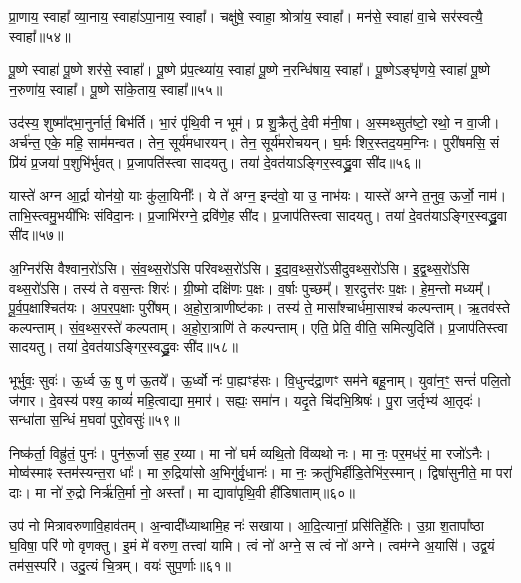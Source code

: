 प्रा॒णाय॒ स्वाहा᳚ व्या॒नाय॒ स्वाहा॑ऽपा॒नाय॒ स्वाहा᳚। 
चक्षु॑षे॒ स्वाहा॒ श्रोत्रा॑य॒ स्वाहा᳚। 
मन॑से॒ स्वाहा॑ वा॒चे सर॑स्वत्यै॒ स्वाहा᳚॥५४॥%
\anuvakamend

पू॒ष्णे स्वाहा॑ पू॒ष्णे शर॑से॒ स्वाहा᳚। 
पू॒ष्णे प्र॑प॒त्थ्या॑य॒ स्वाहा॑ पू॒ष्णे न॒रन्धि॑षाय॒ स्वाहा᳚। 
पू॒ष्णेऽङ्घृ॑णये॒ स्वाहा॑ पू॒ष्णे न॒रुणा॑य॒ स्वाहा᳚। 
पू॒ष्णे सा॑के॒ताय॒ स्वाहा᳚॥५५॥
\anuvakamend


उद॑स्य॒ शुष्मा᳚द्भा॒नुर्नार्त॒ बिभ॑र्ति। 
भा॒रं पृ॑थि॒वी न भूम॑। 
प्र शु॒क्रैतु॑ दे॒वी म॑नी॒षा। 
अ॒स्मथ्सुत॑ष्टो॒ रथो॒ न वा॒जी। 
अर्च॑न्त॒ एके॒ महि॒ साम॑मन्वत। 
तेन॒ सूर्य॑मधारयन्। 
तेन॒ सूर्य॑मरोचयन्। 
घ॒र्मः  शिर॒स्तद॒यम॒ग्निः। 
पुरी॑षमसि॒ सं प्रि॑यं प्र॒जया॑ प॒शुभि॑र्भुवत्। 
प्र॒जापति॑स्त्वा सादयतु। 
तया॑ दे॒वत॑याऽङ्गिर॒स्वद्ध्रु॒वा सी॑द॥५६॥
\anuvakamend

यास्ते॑ अग्न आ॒र्द्रा योन॑यो॒ याः कु॑ला॒यिनीः᳚। 
ये ते॑ अग्न॒ इन्द॑वो॒ या उ॒ नाभ॑यः। 
यास्ते॑ अग्ने त॒नुव॒ ऊर्जो॒ नाम॑। 
ताभि॒स्त्वमु॒भयी॑भिः संविदा॒नः। 
प्र॒जाभि॑रग्ने॒ द्रवि॑णे॒ह सी॑द। 
प्र॒जाप॑तिस्त्वा सादयतु। 
तया॑ दे॒वत॑याऽङ्गिर॒स्वद्ध्रु॒वा सी॑द॥५७॥
\anuvakamend

अ॒ग्निर॑सि वैश्वान॒रो॑ऽसि। 
सं॒व॒थ्स॒रो॑ऽसि परिवथ्स॒रो॑ऽसि। 
इ॒दा॒व॒थ्स॒रो॑ऽसीदुवथ्स॒रो॑ऽसि। 
इ॒द्व॒थ्स॒रो॑ऽसि वथ्स॒रो॑ऽसि। 
तस्य॑ ते वस॒न्तः  शिरः॑। 
ग्री॒ष्मो दक्षि॑णः प॒क्षः। 
व॒र्\mbox{}षाः पुच्छम्᳚। 
श॒रदुत्त॑रः प॒क्षः। 
हे॒म॒न्तो मध्यम्᳚। 
पू॒र्व॒प॒क्षाश्चित॑यः। 
अ॒प॒र॒प॒क्षाः पुरी॑षम्। 
अ॒हो॒रा॒त्राणीष्ट॑काः। 
तस्य॑ ते॒ मासा᳚श्चार्धमा॒साश्च॑ कल्पन्ताम्। 
ऋ॒तव॑स्ते कल्पन्ताम्। 
सं॒व॒थ्स॒रस्ते॑ कल्पताम्। 
अ॒हो॒रा॒त्राणि॑ ते कल्पन्ताम्। 
एति॒ प्रेति॒ वीति॒ समित्युदिति॑। 
प्र॒जाप॑तिस्त्वा सादयतु। 
तया॑ दे॒वत॑याऽङ्गिर॒स्वद्ध्रु॒वः सी॑द॥५८॥
\anuvakamend[चित॑यो॒ नव॑ च]


भूर्भुवः॒ सुवः॑। 
ऊ॒र्ध्व ऊ॒ षु ण॑ ऊ॒तये᳚। 
ऊ॒र्ध्वो नः॑ पा॒ह्यꣳह॑सः। 
वि॒धुन्द॑द्रा॒णꣳ सम॑ने बहू॒नाम्। 
युवा॑न॒ꣳ॒ सन्तं॑ पलि॒तो ज॑गार। 
दे॒वस्य॑ पश्य॒ काव्यं॑ महि॒त्वाद्या म॒मार॑। 
सह्यः॒ समा॑न। 
यदृ॒ते चि॑दभि॒श्रिषः॑। 
पु॒रा ज॒र्तृभ्य॑ आ॒तृदः॑। 
सन्धा॑ता स॒न्धिं म॒घवा॑ पुरो॒वसुः॑॥५९॥

निष्क॑र्ता॒ विह्रु॑तं॒ पुनः॑। 
पुन॑रू॒र्जा स॒ह र॒य्या। 
मा नो॑ घर्म व्यथि॒तो वि॑व्यथो नः। 
मा नः॒ पर॒मध॑रं॒ मा रजो॑ऽनैः। 
मोष्व॑स्माꣴ स्तम॑स्यन्त॒रा धाः᳚। 
मा रु॒द्रिया॑सो अ॒भिगु॑र्वृ॒धानः॑। 
मा नः॒ क्रतु॑भिर्\mbox{}हीडि॒तेभि॑र॒स्मान्। 
द्विषा॑सुनीते॒ मा परा॑ दाः। 
मा नो॑ रु॒द्रो निर्\mbox{}ऋ॑ति॒र्मा नो॒ अस्ता᳚। 
मा द्यावा॑पृथि॒वी ही॑डिषाताम्॥६०॥

उप॑ नो मित्रावरुणावि॒हाव॑तम्। 
अ॒न्वादी᳚ध्याथामि॒ह नः॑ सखाया। 
आ॒दि॒त्यानां॒ प्रसि॑तिर्\mbox{}हे॒तिः। 
उ॒ग्रा श॒तापा᳚ष्ठा घ॒विषा॒ परि॑ णो वृणक्तु। 
इ॒मं मे॑ वरुण॒ तत्त्वा॑ यामि। 
त्वं नो॑ अग्ने॒ स त्वं नो॑ अग्ने। 
त्वम॑ग्ने अ॒यासि॑। 
उद्व॒यं तम॑स॒स्परि॑। 
उदु॒त्यं चि॒त्रम्। 
वयः॑ सुप॒र्णाः॥६१॥
\anuvakamend[पु॒रो॒वसु॑र्\mbox{}हीडिषाताꣳ सुप॒र्णाः]


